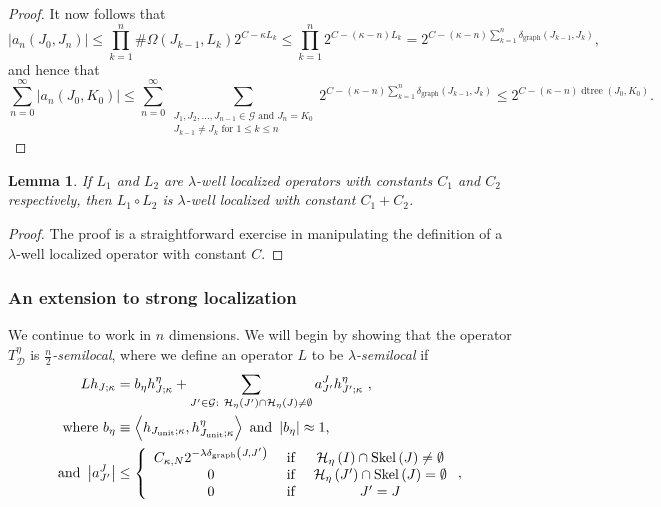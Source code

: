 \documentclass{amsart}%
\theoremstyle{plain}
\newtheorem{lemma}[theorem]{Lemma}
\numberwithin{equation}{section}
\begin{document}
\begin{proof}
It now follows that
\[
\left\vert a_{n}\left(  J_{0},J_{n}\right)  \right\vert \leq\prod_{k=1}%
^{n}\#\Omega\left(  J_{k-1},L_{k}\right)  2^{C-\kappa L_{k}}\leq\prod
_{k=1}^{n}2^{C-\left(  \kappa-n\right)  L_{k}}=2^{C-\left(  \kappa-n\right)
\sum_{k=1}^{n}\delta_{\operatorname*{graph}}\left(  J_{k-1},J_{k}\right)  },
\]
and hence that%
\[
\sum_{n=0}^{\infty}\left\vert a_{n}\left(  J_{0},K_{0}\right)  \right\vert
\leq\sum_{n=0}^{\infty}\sum_{\substack{J_{1},J_{2},...,J_{n-1}\in
\mathcal{G}\text{ and }J_{n}=K_{0}\\J_{k-1}\neq J_{k}\text{ for }1\leq k\leq
n}}2^{C-\left(  \kappa-n\right)  \sum_{k=1}^{n}\delta_{\operatorname*{graph}%
}\left(  J_{k-1},J_{k}\right)  }\leq2^{C-\left(  \kappa-n\right)
\operatorname*{dtree}\left(  J_{0},K_{0}\right)  }.
\]

\end{proof}

\begin{lemma}
\label{comp}If $L_{1}$ and $L_{2}$ are $\lambda$-well localized operators with
constants $C_{1}$ and $C_{2}$ respectively, then $L_{1}\circ L_{2}$ is
$\lambda$-well localized with constant $C_{1}+C_{2}$.
\end{lemma}

\begin{proof}
The proof is a straightforward exercise in manipulating the definition of a
$\lambda$-well localized operator with constant $C$.
\end{proof}

\subsubsection{An extension to strong localization}

We continue to work in $n$ dimensions. We will begin by showing that the
operator $T_{\mathcal{D}}^{\eta}$ is $\frac{n}{2}$\emph{-semilocal}, where we
define an operator $L$ to be $\lambda$\emph{-semilocal }if
\begin{align*}
Lh_{J;\kappa}  & =b_{\eta}h_{J;\kappa}^{\eta}+\sum_{J^{\prime}\in
\mathcal{G}:\ \mathcal{H}_{\eta}\left(  J^{\prime}\right)  \cap\mathcal{H}%
_{\eta}\left(  J\right)  \neq\emptyset}a_{J^{\prime}}^{J}h_{J^{\prime};\kappa
}^{\eta}\ ,\\
\text{where }b_{\eta}  & \equiv\left\langle h_{J_{\operatorname*{unit}}%
;\kappa},h_{J_{\operatorname*{unit}};\kappa}^{\eta}\right\rangle \text{ and
}\left\vert b_{\eta}\right\vert \approx1,\\
\text{and }\left\vert a_{J^{\prime}}^{J}\right\vert  & \leq\left\{
\begin{array}
[c]{ccc}%
C_{\kappa,N}2^{-\lambda\delta_{\operatorname*{graph}}\left(  J,J^{\prime
}\right)  } & \text{ if } & \mathcal{H}_{\eta}\left(  I\right)  \cap
\operatorname*{Skel}\left(  J\right)  \neq\emptyset\\
0 & \text{ if } & \mathcal{H}_{\eta}\left(  J^{\prime}\right)  \cap
\operatorname*{Skel}\left(  J\right)  =\emptyset\\
0 & \text{ if } & J^{\prime}=J
\end{array}
\right.  ,
\end{align*}
\end{document}
